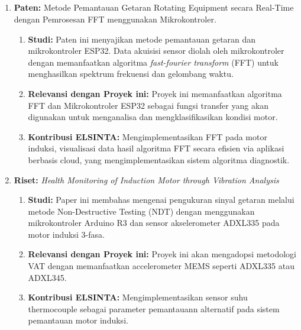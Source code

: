 \documentclass{elsinta}
\begin{document}
\subsection{\RelResearchPatentsTitle}
\begin{enumerate}
    \item \textbf{Paten:} Metode Pemantauan Getaran Rotating Equipment secara Real-Time dengan Pemrosesan FFT menggunakan Mikrokontroler.
    \begin{enumerate}
        \item \textbf{Studi:} Paten ini menyajikan metode pemantauan getaran dan mikrokontroler ESP32. Data akuisisi sensor diolah oleh mikrokontroler dengan memanfaatkan algoritma \textit{fast-fourier transform} (FFT) untuk menghasilkan spektrum frekuensi dan gelombang waktu.
        \item \textbf{Relevansi dengan  Proyek ini:} Proyek ini memanfaatkan algoritma FFT dan Mikrokontroler ESP32 sebagai fungsi transfer yang akan digunakan untuk menganalisa dan mengklasifikasikan kondisi motor.
        \item \textbf{Kontribusi  ELSINTA:} Mengimplementasikan FFT pada motor induksi, visualisasi data hasil algoritma FFT secara efisien via aplikasi berbasis cloud, yang mengimplementasikan sistem algoritma diagnostik.
    \end{enumerate}
    \item \textbf{Riset:} \textit{Health Monitoring of Induction Motor through Vibration Analysis} \cite{1.1.17}
    \begin{enumerate}
        \item \textbf{Studi:} Paper ini membahas mengenai pengukuran sinyal getaran melalui metode Non-Destructive Testing (NDT) dengan menggunakan mikrokontroler Arduino R3 dan sensor akselerometer ADXL335 pada motor induksi 3-fasa.
        \item \textbf{Relevansi dengan  Proyek ini:} Proyek ini akan mengadopsi metodologi VAT dengan memanfaatkan accelerometer MEMS seperti ADXL335 atau ADXL345.
        \item \textbf{Kontribusi  ELSINTA:} Mengimplementasikan sensor suhu thermocouple sebagai parameter pemantauann alternatif pada sistem pemantauan motor induksi.
    \end{enumerate}
    

\end{enumerate}
\end{document}
